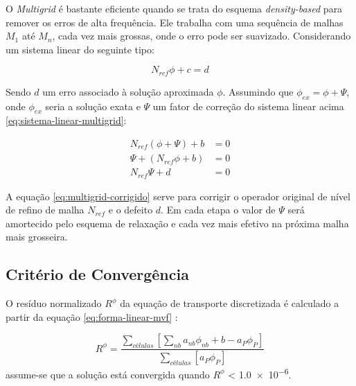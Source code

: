 O \textit{Multigrid} é bastante eficiente quando se trata do esquema \textit{density-based} para remover os erros de alta frequência. Ele trabalha com uma sequência de malhas \(M_1\) até \(M_n\), cada vez mais grossas, onde o erro pode ser suavizado. Considerando um sistema linear do seguinte tipo:

\begin{equation}
    \label{eq:sistema-linear-multigrid}
    N_{ref}\phi + c = d
\end{equation}

Sendo \(d\) um erro associado à solução aproximada \(\phi\). Assumindo que \(\phi_{ex} = \phi + \Psi\), onde \(\phi_{ex}\) seria a solução exata e \(\Psi\) um fator de correção do sistema linear acima \ref{eq:sistema-linear-multigrid}:

\begin{subequations}\label{eq:multigrid-corrigido} 
\begin{align}
    N_{ref}(\phi + \Psi) + b &= 0 \\
    \Psi + (N_{ref}\phi + b) &= 0 \\
    N_{ref}\Psi + d &= 0
\end{align}
\end{subequations}

A equação \ref{eq:multigrid-corrigido} serve para corrigir o operador original de nível de refino de malha \(N_{ref}\) e o defeito \(d\). Em cada etapa o valor de \(\Psi\) será amortecido pelo esquema de relaxação e cada vez mais efetivo na próxima malha mais grosseira.

\subsection{Critério de Convergência}

O resíduo normalizado \(R^{\phi}\) da equação de transporte discretizada é calculado a partir da equação \ref{eq:forma-linear-mvf} \cite{Rezende2009}:

\begin{equation}
\label{eq:criterio-convergencia}
	R^{\phi} = \frac{\sum_{células} \left[ \sum_{nb}a_{nb}\phi_{nb}+b-a_{P}\phi_{P}\right]}{\sum_{células}\left[a_{P}\phi_{P}\right]}    
\end{equation}
%
assume-se que a solução está convergida quando \(R^{\phi}\) < \num{1,0e-6}.